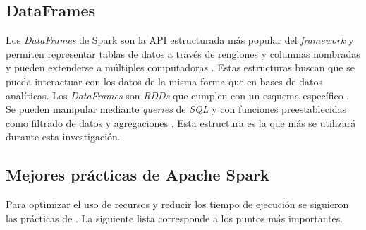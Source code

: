 \subsection{DataFrames}

Los \textit{DataFrames} de Spark son la API estructurada más popular del \textit{framework} y permiten representar tablas de datos a través de renglones y columnas nombradas y pueden extenderse a múltiples computadoras \cite{sparkguide}. Estas estructuras buscan que se pueda interactuar con los datos de la misma forma que en bases de datos analíticas. Los \textit{DataFrames} son \textit{RDDs} que cumplen con un esquema específico \cite{sparkberkeley}. Se pueden manipular mediante \textit{queries} de \textit{SQL} y con funciones preestablecidas como filtrado de datos y agregaciones \cite{sparkberkeley}. Esta estructura es la que más se utilizará durante esta investigación.

\subsection{Mejores prácticas de Apache Spark}

Para optimizar el uso de recursos y reducir los tiempo de ejecución se siguieron las prácticas de \cite{sparkibm}. La siguiente lista corresponde a los puntos más importantes.

